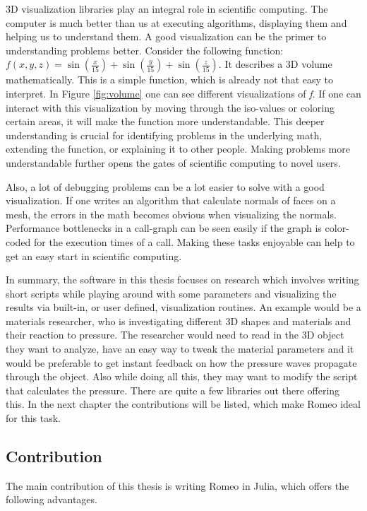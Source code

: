 3D visualization libraries play an integral role in scientific computing.
The computer is much better than us at executing algorithms, displaying them and helping us to understand them.
A good visualization can be the primer to understanding problems better.
Consider the following function: $f(x,y,z)=\sin(\frac{x}{15})+\sin(\frac{y}{15})+\sin(\frac{z}{15})$. 
It describes a 3D volume mathematically. 
This is a simple function, which is already not that easy to interpret. In Figure \ref{fig:volume} one can see different visualizations of \textit{f}.
If one can interact with this visualization by moving through the iso-values or coloring certain areas, it will make the function more understandable.
This deeper understanding is crucial for identifying problems in the underlying math, extending the function, or explaining it to other people. 
Making problems more understandable further opens the gates of scientific computing to novel users.

Also, a lot of debugging problems can be a lot easier to solve with a good visualization. 
If one writes an algorithm that calculate normals of faces on a mesh, the errors in the math becomes obvious when visualizing the normals.
Performance bottlenecks in a call-graph can be seen easily if the graph is color-coded for the execution times of a call. 
Making these tasks enjoyable can help to get an easy start in scientific computing.

In summary, the software in this thesis focuses on research which involves writing short scripts while playing around with some parameters and visualizing the results via built-in, or user defined, visualization routines.
An example would be a materials researcher, who is investigating different 3D shapes and materials and their reaction to pressure.
The researcher would need to read in the 3D object they want to analyze, have an easy way to tweak the material parameters and it would be preferable to get instant feedback on how the pressure waves propagate through the object. Also while doing all this, they may want to modify the script that calculates the pressure.
There are quite a few libraries out there offering this. In the next chapter the contributions will be listed, which make Romeo ideal for this task.


\subsection{Contribution}

The main contribution of this thesis is writing Romeo in Julia, which offers the following advantages.

